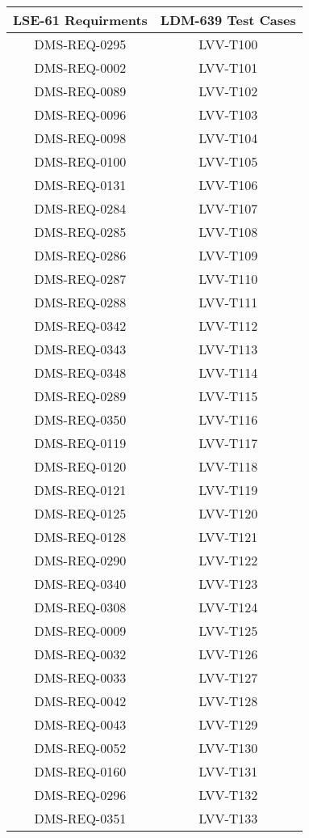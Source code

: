 \begin{longtable}{|c|c|}
\hline
{\bf LSE-61 Requirments} & {\bf LDM-639 Test Cases} \\\hline
DMS-REQ-0295 & LVV-T100\\\hline
DMS-REQ-0002 & LVV-T101\\\hline
DMS-REQ-0089 & LVV-T102\\\hline
DMS-REQ-0096 & LVV-T103\\\hline
DMS-REQ-0098 & LVV-T104\\\hline
DMS-REQ-0100 & LVV-T105\\\hline
DMS-REQ-0131 & LVV-T106\\\hline
DMS-REQ-0284 & LVV-T107\\\hline
DMS-REQ-0285 & LVV-T108\\\hline
DMS-REQ-0286 & LVV-T109\\\hline
DMS-REQ-0287 & LVV-T110\\\hline
DMS-REQ-0288 & LVV-T111\\\hline
DMS-REQ-0342 & LVV-T112\\\hline
DMS-REQ-0343 & LVV-T113\\\hline
DMS-REQ-0348 & LVV-T114\\\hline
DMS-REQ-0289 & LVV-T115\\\hline
DMS-REQ-0350 & LVV-T116\\\hline
DMS-REQ-0119 & LVV-T117\\\hline
DMS-REQ-0120 & LVV-T118\\\hline
DMS-REQ-0121 & LVV-T119\\\hline
DMS-REQ-0125 & LVV-T120\\\hline
DMS-REQ-0128 & LVV-T121\\\hline
DMS-REQ-0290 & LVV-T122\\\hline
DMS-REQ-0340 & LVV-T123\\\hline
DMS-REQ-0308 & LVV-T124\\\hline
DMS-REQ-0009 & LVV-T125\\\hline
DMS-REQ-0032 & LVV-T126\\\hline
DMS-REQ-0033 & LVV-T127\\\hline
DMS-REQ-0042 & LVV-T128\\\hline
DMS-REQ-0043 & LVV-T129\\\hline
DMS-REQ-0052 & LVV-T130\\\hline
DMS-REQ-0160 & LVV-T131\\\hline
DMS-REQ-0296 & LVV-T132\\\hline
DMS-REQ-0351 & LVV-T133\\\hline

\end{longtable}
